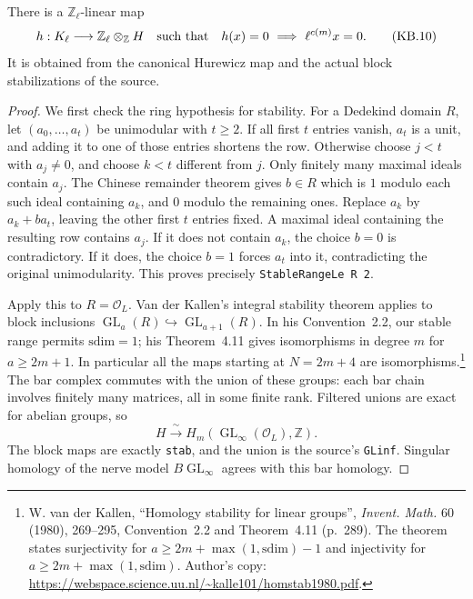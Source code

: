 \begin{proposition}
\label{claim:KB3}
There is a $\mathbb Z_\ell$-linear map
\[
 h:K_\ell\longrightarrow\mathbb Z_\ell\otimes_{\mathbb Z}H
 \quad\hbox{such that}\quad
 h(x)=0\ \Longrightarrow\ \ell^{c(m)}x=0.
 \tag{KB.10}
\]
It is obtained from the canonical Hurewicz map and the actual block
stabilizations of the source.
\end{proposition}

\begin{proof}
We first check the ring hypothesis for stability.  For a Dedekind
domain $R$, let $(a_0,\ldots,a_t)$ be unimodular with $t\ge2$.
If all first $t$ entries vanish, $a_t$ is a unit, and adding it to
one of those entries shortens the row.  Otherwise choose $j<t$
with $a_j\ne0$, and choose $k<t$ different from $j$.  Only finitely
many maximal ideals contain $a_j$.  The Chinese remainder theorem
gives $b\in R$ which is $1$ modulo each such ideal containing
$a_k$, and $0$ modulo the remaining ones.  Replace $a_k$ by
$a_k+ba_t$, leaving the other first $t$ entries fixed.  A maximal
ideal containing the resulting row contains $a_j$.  If it does
not contain $a_k$, the choice $b=0$ is contradictory.  If it does,
the choice $b=1$ forces $a_t$ into it, contradicting the original
unimodularity.  This proves precisely \texttt{StableRangeLe R 2}.

Apply this to $R=\mathcal O_L$.  Van der Kallen's integral stability
theorem applies to block inclusions $\operatorname{GL}_a(R)
\hookrightarrow\operatorname{GL}_{a+1}(R)$.  In his Convention~2.2,
our stable range permits $\mathrm{sdim}=1$; his Theorem~4.11 gives
isomorphisms in degree $m$ for $a\ge2m+1$.
In particular all the maps starting at $N=2m+4$ are
isomorphisms.\footnote{W. van der Kallen, ``Homology stability for
linear groups'', \emph{Invent. Math.} 60 (1980), 269--295,
Convention~2.2 and Theorem~4.11 (p.~289).
The theorem states surjectivity for $a\ge2m+\max(1,\mathrm{sdim})-1$
and injectivity for $a\ge2m+\max(1,\mathrm{sdim})$.
Author's copy: \url{https://webspace.science.uu.nl/~kalle101/homstab1980.pdf}.}
The bar complex commutes with the union of these groups: each bar
chain involves finitely many matrices, all in some finite rank.
Filtered unions are exact for abelian groups, so
\[
 H\xrightarrow{\ \sim\ }
 H_m(\operatorname{GL}_\infty(\mathcal O_L),\mathbb Z).
 \tag{KB.11}
\]
The block maps are exactly \texttt{stab}, and the union is the
source's \texttt{GLinf}.  Singular homology of the nerve model
$B\operatorname{GL}_\infty$ agrees with this bar homology.


\end{proof}
